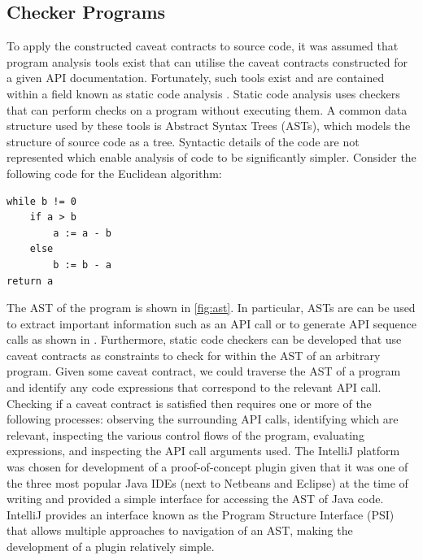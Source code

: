 \subsection{Checker Programs}
\label{sec:code-checker}
To apply the constructed caveat contracts to source code, it was assumed that program analysis tools exist that can utilise the caveat contracts constructed for a given API documentation. Fortunately, such tools exist and are contained within a field known as static code analysis \cite{1657940}. Static code analysis uses checkers that can perform checks on a program without executing them. A common data structure used by these tools is Abstract Syntax Trees (ASTs), which models the structure of source code as a tree. Syntactic details of the code are not represented which enable analysis of code to be significantly simpler. Consider the following code for the Euclidean algorithm:

\begin{verbatim}
while b != 0
    if a > b
        a := a - b
    else
        b := b - a
return a
\end{verbatim}

The AST of the program is shown in \ref{fig:ast}. In particular, ASTs are can be used to extract important information such as an API call or to generate API sequence calls as shown in \cite{code-examples}. Furthermore, static code checkers can be developed that use caveat contracts as constraints to check for within the AST of an arbitrary program. Given some caveat contract, we could traverse the AST of a program and identify any code expressions that correspond to the relevant API call. Checking if a caveat contract is satisfied then requires one or more of the following processes: observing the surrounding API calls, identifying which are relevant, inspecting the various control flows of the program, evaluating expressions, and inspecting the API call arguments used.
The IntelliJ platform was chosen for development of a proof-of-concept plugin given that it was one of the three most popular Java IDEs (next to Netbeans and Eclipse) at the time of writing and provided a simple interface for accessing the AST of Java code. IntelliJ provides an interface known as the Program Structure Interface (PSI) that allows multiple approaches to navigation of an AST, making the development of a plugin relatively simple.

